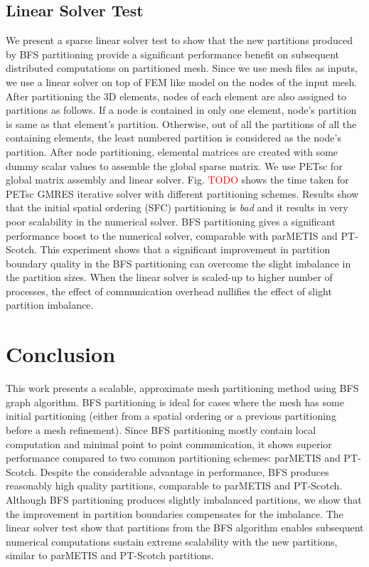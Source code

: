 \documentclass[conference]{IEEEtran}
\begin{document}
\subsection{Linear Solver Test}
We present a sparse linear solver test to show that the new partitions produced by BFS partitioning provide a significant performance benefit on subsequent distributed computations on partitioned mesh. Since we use mesh files as inputs, we use a linear solver on top of FEM like model on the nodes of the input mesh. After partitioning the 3D elements, nodes of each element are also assigned to partitions as follows. If a node is contained in only one element, node's partition is same as that element's partition. Otherwise, out of all the partitions of all the containing elements, the least numbered partition is considered as the node's partition. After node partitioning, elemental matrices are created with some dummy scalar values to assemble the global sparse matrix. We use PETsc \cite{petsc-web-page} for global matrix assembly and linear solver. Fig. \textcolor{red}{TODO} shows the time taken for PETsc GMRES \cite{GMRES} iterative solver with different partitioning schemes. Results show that the initial spatial ordering (SFC) partitioning is \emph{bad} and it results in very poor scalability in the numerical solver. BFS partitioning gives a significant performance boost to the numerical solver, comparable with parMETIS and PT-Scotch. This experiment shows that a significant improvement in partition boundary quality in the BFS partitioning can overcome the slight imbalance in the partition sizes. When the linear solver is scaled-up to higher number of processes, the effect of communication overhead nullifies the effect of slight partition imbalance. 

\section{Conclusion}
This work presents a scalable, approximate mesh partitioning method using BFS graph algorithm. BFS partitioning is ideal for cases where the mesh has some initial partitioning (either from a spatial ordering or a previous partitioning before a mesh refinement). Since BFS partitioning mostly contain local computation and minimal point to point communication, it shows superior performance compared to two common partitioning schemes: parMETIS and PT-Scotch. Despite the considerable advantage in performance, BFS produces reasonably high quality partitions, comparable to parMETIS and PT-Scotch. Although BFS partitioning produces slightly imbalanced partitions, we show that the improvement in partition boundaries compensates for the imbalance. The linear solver test show that partitions from the BFS algorithm enables subsequent numerical computations sustain extreme scalability with the new partitions, similar to parMETIS and PT-Scotch partitions. 
\end{document}
